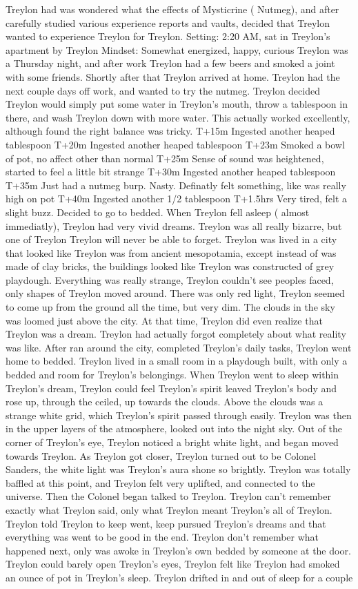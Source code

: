 \documentclass[12pt]{book}
\begin{document}
Treylon had was wondered what the effects of Mysticrine ( Nutmeg), and after carefully studied various experience reports and vaults, decided that Treylon wanted to experience Treylon for Treylon. Setting: 2:20 AM, sat in Treylon's apartment by Treylon Mindset: Somewhat energized, happy, curious Treylon was a Thursday night, and after work Treylon had a few beers and smoked a joint with some friends. Shortly after that Treylon arrived at home. Treylon had the next couple days off work, and wanted to try the nutmeg. Treylon decided Treylon would simply put some water in Treylon's mouth, throw a tablespoon in there, and wash Treylon down with more water. This actually worked excellently, although found the right balance was tricky. T+15m Ingested another heaped tablespoon T+20m Ingested another heaped tablespoon T+23m Smoked a bowl of pot, no affect other than normal T+25m Sense of sound was heightened, started to feel a little bit strange T+30m Ingested another heaped tablespoon T+35m Just had a nutmeg burp. Nasty. Definatly felt something, like was really high on pot T+40m Ingested another 1/2 tablespoon T+1.5hrs Very tired, felt a slight buzz. Decided to go to bedded. When Treylon fell asleep ( almost immediatly), Treylon had very vivid dreams. Treylon was all really bizarre, but one of Treylon Treylon will never be able to forget. Treylon was lived in a city that looked like Treylon was from ancient mesopotamia, except instead of was made of clay bricks, the buildings looked like Treylon was constructed of grey playdough. Everything was really strange, Treylon couldn't see peoples faced, only shapes of Treylon moved around. There was only red light, Treylon seemed to come up from the ground all the time, but very dim. The clouds in the sky was loomed just above the city. At that time, Treylon did even realize that Treylon was a dream. Treylon had actually forgot completely about what reality was like. After ran around the city, completed Treylon's daily tasks, Treylon went home to bedded. Treylon lived in a small room in a playdough built, with only a bedded and room for Treylon's belongings. When Treylon went to sleep within Treylon's dream, Treylon could feel Treylon's spirit leaved Treylon's body and rose up, through the ceiled, up towards the clouds. Above the clouds was a strange white grid, which Treylon's spirit passed through easily. Treylon was then in the upper layers of the atmosphere, looked out into the night sky. Out of the corner of Treylon's eye, Treylon noticed a bright white light, and began moved towards Treylon. As Treylon got closer, Treylon turned out to be Colonel Sanders, the white light was Treylon's aura shone so brightly. Treylon was totally baffled at this point, and Treylon felt very uplifted, and connected to the universe. Then the Colonel began talked to Treylon. Treylon can't remember exactly what Treylon said, only what Treylon meant Treylon's all of Treylon. Treylon told Treylon to keep went, keep pursued Treylon's dreams and that everything was went to be good in the end. Treylon don't remember what happened next, only was awoke in Treylon's own bedded by someone at the door. Treylon could barely open Treylon's eyes, Treylon felt like Treylon had smoked an ounce of pot in Treylon's sleep. Treylon drifted in and out of sleep for a couple 
\end{document}
